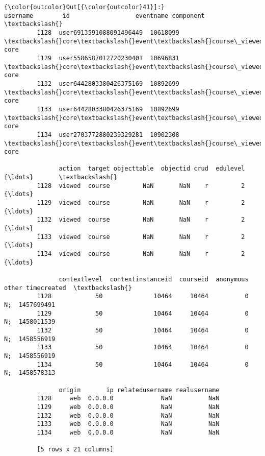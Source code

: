 \documentclass[11pt]{article}
\begin{document}
\begin{Verbatim}[commandchars=\\\{\}]
{\color{outcolor}Out[{\color{outcolor}41}]:}                      username        id                  eventname component  \textbackslash{}
         1128  user6913591088091496449  10618099  \textbackslash{}core\textbackslash{}event\textbackslash{}course\_viewed      core   
         1129  user5586587012720230401  10696831  \textbackslash{}core\textbackslash{}event\textbackslash{}course\_viewed      core   
         1132  user6442803380426375169  10892699  \textbackslash{}core\textbackslash{}event\textbackslash{}course\_viewed      core   
         1133  user6442803380426375169  10892699  \textbackslash{}core\textbackslash{}event\textbackslash{}course\_viewed      core   
         1134  user2703772880239329281  10902308  \textbackslash{}core\textbackslash{}event\textbackslash{}course\_viewed      core   
         
               action  target objecttable  objectid crud  edulevel     {\ldots}       \textbackslash{}
         1128  viewed  course         NaN       NaN    r         2     {\ldots}        
         1129  viewed  course         NaN       NaN    r         2     {\ldots}        
         1132  viewed  course         NaN       NaN    r         2     {\ldots}        
         1133  viewed  course         NaN       NaN    r         2     {\ldots}        
         1134  viewed  course         NaN       NaN    r         2     {\ldots}        
         
               contextlevel  contextinstanceid  courseid  anonymous  other timecreated  \textbackslash{}
         1128            50              10464     10464          0     N;  1457699491   
         1129            50              10464     10464          0     N;  1458011539   
         1132            50              10464     10464          0     N;  1458556919   
         1133            50              10464     10464          0     N;  1458556919   
         1134            50              10464     10464          0     N;  1458578313   
         
               origin       ip relatedusername realusername  
         1128     web  0.0.0.0             NaN          NaN  
         1129     web  0.0.0.0             NaN          NaN  
         1132     web  0.0.0.0             NaN          NaN  
         1133     web  0.0.0.0             NaN          NaN  
         1134     web  0.0.0.0             NaN          NaN  
         
         [5 rows x 21 columns]
\end{Verbatim}
            
\end{document}
